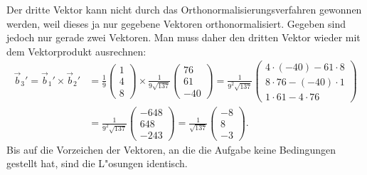 \begin{loesung}
\[\]
Der dritte Vektor kann nicht durch das Orthonormalisierungsverfahren
gewonnen werden, weil dieses ja nur gegebene Vektoren orthonormalisiert.
Gegeben sind jedoch nur gerade zwei Vektoren. Man muss daher den dritten
Vektor wieder mit dem Vektorprodukt ausrechnen:
\begin{align*}
\vec b_3'
=
\vec b_1'\times\vec b_2'
&=
\frac19
\begin{pmatrix}
1\\4\\8
\end{pmatrix}
\times
\frac1{9\sqrt{137}}\begin{pmatrix}
76\\
61\\
-40
\end{pmatrix}
=
\frac1{9^2\sqrt{137}}
\begin{pmatrix}
4\cdot (-40)-61\cdot 8\\
8\cdot 76-(-40)\cdot 1\\
1\cdot 61-4\cdot 76
\end{pmatrix}
\\
&=
\frac1{9^2\sqrt{137}}
\begin{pmatrix}
-648\\
648\\
-243
\end{pmatrix}
=
\frac1{\sqrt{137}}
\begin{pmatrix}
-8\\
8\\
-3
\end{pmatrix}.
\end{align*}
Bis auf die Vorzeichen der Vektoren, an die die Aufgabe keine Bedingungen
gestellt hat, sind die L"osungen identisch.
\end{loesung}

